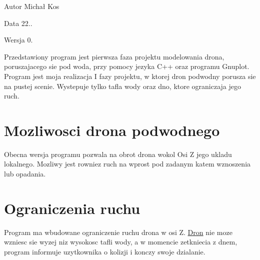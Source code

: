 \begin{DoxyAuthor}{Autor}
Michał Kos 
\end{DoxyAuthor}
\begin{DoxyDate}{Data}
22.. 
\end{DoxyDate}
\begin{DoxyVersion}{Wersja}
0.
\end{DoxyVersion}
Przedstawiony program jest pierwsza faza projektu modelowania drona, poruszajacego sie pod woda, przy pomocy jezyka C++ oraz programu Gnuplot. Program jest moja realizacja I fazy projektu, w ktorej dron podwodny porusza sie na pustej scenie. Wystepuje tylko tafla wody oraz dno, ktore ograniczaja jego ruch.\hypertarget{index_mozliwosci-dron}{}\section{Mozliwosci drona podwodnego}\label{index_mozliwosci-dron}
Obecna wersja programu pozwala na obrot drona wokol Osi Z jego ukladu lokalnego. Mozliwy jest rowniez ruch na wprost pod zadanym katem wznoszenia lub opadania.\hypertarget{index_ograniczenia-ruchu}{}\section{Ograniczenia ruchu}\label{index_ograniczenia-ruchu}
Program ma wbudowane ograniczenie ruchu drona w osi Z. \hyperlink{class_dron}{Dron} nie moze wzniesc sie wyzej niz wysokosc tafli wody, a w momencie zetkniecia z dnem, program informuje uzytkownika o kolizji i konczy swoje dzialanie. 